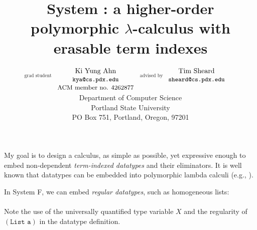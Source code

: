 \documentclass{article}
\title{System \Fi: a higher-order polymorphic $\lambda$-calculus
	with erasable term indexes \vspace*{-5pt}}
\author{
 $\begin{matrix}_\text{grad student}\\ ~ \\ ~ \end{matrix}\!\!\!\!\!\!\!\!$
 $\begin{matrix}\text{Ki Yung Ahn} \\ \texttt{\small kya@cs.pdx.edu} \\
   \text{\small ACM member no. 4262877}   \end{matrix}$
 $\!\!\!\!\begin{matrix}_\text{advised by}\\ ~ \\ ~ \end{matrix}$
 $\begin{matrix}\text{Tim Sheard} \\ \texttt{\small sheard@cs.pdx.edu} \\ ~ \end{matrix}
 \qquad$
 \vspace*{5pt} \\
 \small Department of Computer Science \\
 \small Portland State University \\ \small PO Box 751, Portland, Oregon, 97201
}
\date{\small \vspace*{-12pt}
 }
\begin{document}
\maketitle \vspace*{-15pt}
My goal is to design a calculus, as simple as possible, yet expressive enough
to embed non-dependent \emph{term-indexed datatypes} and their eliminators.
It is well known that datatypes can be embedded into polymorphic lambda calculi
(e.g., \cite{AbeMatUus03}).

In System \textsf{F}, we can embed \emph{regular datatypes},
such as homogeneous lists:\vspace*{1pt}\\
\vspace*{1pt}\\
Note the use of the universally quantified type variable $X$
and the regularity of $(\texttt{List a})$ in the datatype definition.
\end{document}
